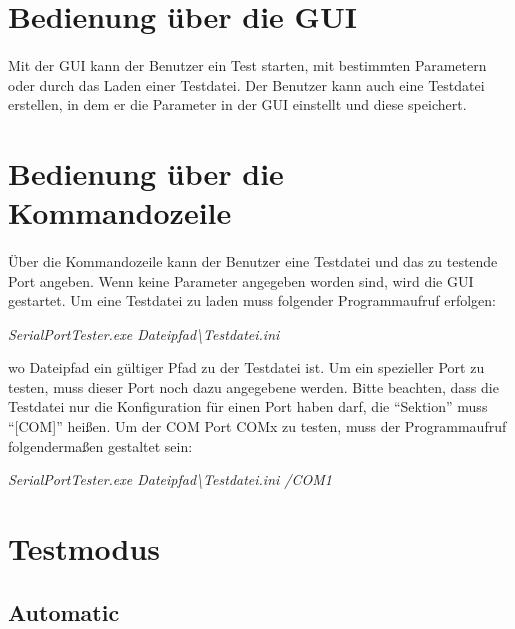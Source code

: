 \section{Bedienung über die GUI}
\paragraph{}
Mit der GUI kann der Benutzer ein Test starten, mit bestimmten Parametern oder durch das Laden einer Testdatei. Der Benutzer kann auch eine Testdatei erstellen, in dem er die Parameter in der GUI einstellt und diese speichert.

\section{Bedienung über die Kommandozeile}
\paragraph{}
Über die Kommandozeile kann der Benutzer eine Testdatei und das zu testende Port angeben. Wenn keine Parameter angegeben worden sind, wird die GUI gestartet. Um eine Testdatei zu laden muss folgender Programmaufruf erfolgen:
\begin{center}
\textit{SerialPortTester.exe Dateipfad\textbackslash Testdatei.ini}
\end{center}

wo Dateipfad ein gültiger Pfad zu der Testdatei ist. Um ein spezieller Port zu testen, muss dieser Port noch dazu angegebene werden. Bitte beachten, dass die Testdatei nur die Konfiguration für einen Port haben darf, die "`Sektion"' muss "`[COM]"' heißen. Um der COM Port COMx zu testen, muss der Programmaufruf folgendermaßen gestaltet sein:

\begin{center}
\textit{SerialPortTester.exe Dateipfad\textbackslash Testdatei.ini /COM1}
\end{center}

\section{Testmodus}

\subsection{Automatic}
